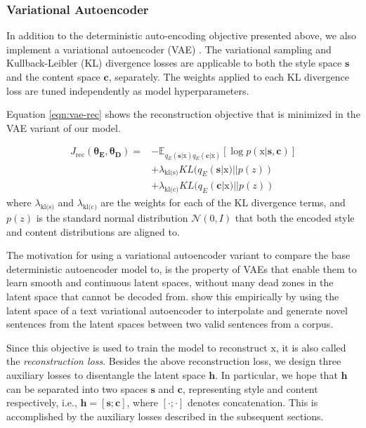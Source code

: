 \documentclass[letterpaper]{article} %
\newcommand{\rmx}{\mathrm x}
\newcommand{\loss}[1]{J_{\text{#1}}}
\newcommand{\hyp}[1]{\lambda_{\text{#1}}}
\newcommand{\nnweight}[1]{\bm{\theta_{\text{#1}}}}
\newcommand{\citeay}[1]{\citeauthor{#1} \shortcite{#1}}
\begin{document}
\subsubsection{Variational Autoencoder}

In addition to the deterministic auto-encoding objective presented above, we also implement a variational autoencoder (VAE) \cite{kingma2013auto}.
The variational sampling and Kullback-Leibler (KL) divergence \cite{kullback1951information} losses are applicable to both the style space $\bm s$ and the content space $\bm c$, separately.
The weights applied to each KL divergence loss are tuned independently as model hyperparameters.

Equation \ref{eqn:vae-rec} shows the reconstruction objective that is minimized in the VAE variant of our model.

\begin{align} \label{eqn:vae-rec}
	\loss{rec}(\nnweight{E}, \nnweight{D}) = \nonumber
	 & - \mathbb{E}_{q_{E}(\bm s|\rmx) q_{E}(\bm c|\rmx)} [\log p(\rmx|\bm s, \bm c)] \nonumber \\
	 & + \hyp{kl(s)} KL(q_{E}(\bm s|\rmx)||p(z)) \nonumber                                      \\
	 & + \hyp{kl(c)} KL(q_{E}(\bm c|\rmx)||p(z))
\end{align}
where $\hyp{kl(s)}$ and $\hyp{kl(c)}$ are the weights for each of the KL divergence terms, and $p(z)$ is the standard normal distribution $\mathcal{N}(0,I)$ that both the encoded style and content distributions are aligned to.

The motivation for using a variational autoencoder variant to compare the base deterministic autoencoder model to, is the property of VAEs that enable them to learn smooth and continuous latent spaces, without many dead zones in the latent space that cannot be decoded from.
\citeay{bowman2016generating} show this empirically by using the latent space of a text variational autoencoder to interpolate and generate novel sentences from the latent spaces between two valid sentences from a corpus.

Since this objective is used to train the model to reconstruct $\rmx$, it is also called the \textit{reconstruction loss}.
Besides the above reconstruction loss, we design three auxiliary losses to disentangle the latent space $\bm h$.
In particular, we hope that $\bm h$ can be separated into two spaces $\bm s$ and $\bm c$, representing style and content respectively, i.e., $\bm h = [\bm s ; \bm c]$, where $[\cdot;\cdot]$ denotes concatenation.
This is accomplished by the auxiliary losses described in the subsequent sections.
\end{document}
